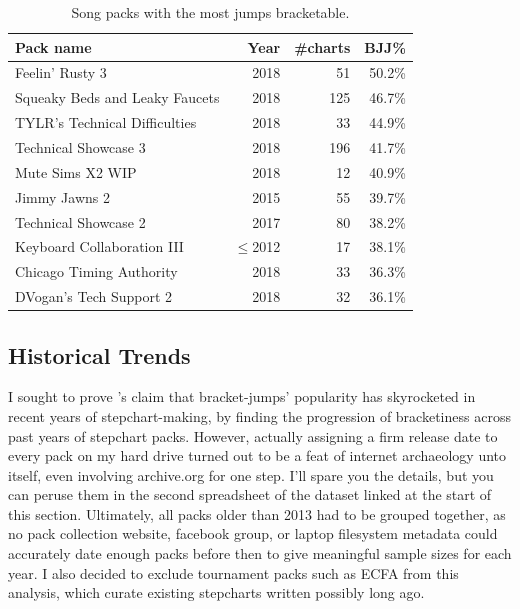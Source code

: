 \documentclass[10pt]{sigplanconf}
\begin{document}
\begin{table}[t]
	\begin{center}
		\small
	\begin{tabular}{l|r|r|r}
		\bf Pack name & \bf Year & \bf \#charts & \bf BJJ\% \\
		\hline
		Feelin' Rusty 3			& 2018	&  51 & 50.2\% \\
		Squeaky Beds and Leaky Faucets	& 2018	& 125 & 46.7\% \\
		TYLR's Technical Difficulties	& 2018	&  33 & 44.9\% \\
		Technical Showcase 3		& 2018	& 196 & 41.7\% \\
		Mute Sims X2 WIP		& 2018	&  12 & 40.9\% \\
		Jimmy Jawns 2			& 2015	&  55 & 39.7\% \\
		Technical Showcase 2		& 2017	&  80 & 38.2\% \\
		Keyboard Collaboration III	& $\le$2012	&  17 & 38.1\% \\
		Chicago Timing Authority	& 2018	&  33 & 36.3\% \\
		DVogan's Tech Support 2		& 2018	&  32 & 36.1\% \\
	\end{tabular}
	\end{center}
	\caption{Song packs with the most jumps bracketable.}
	\label{tab:pack-bjj}
\end{table}

\subsection{Historical Trends}
\label{sec:eval-years}

I sought to prove \cite{dril}'s claim that bracket-jumps' popularity has skyrocketed in recent years of stepchart-making,
by finding the progression of bracketiness across past years of stepchart packs.
However,
actually assigning a firm release date to every pack on my hard drive turned out to be a feat of internet archaeology unto itself,
even involving archive.org for one step.
I'll spare you the details, but you can peruse them in the second spreadsheet of the dataset linked at the start of this section.
Ultimately, all packs older than 2013 had to be grouped together,
as no pack collection website, facebook group, or laptop filesystem metadata could accurately date enough packs
before then to give meaningful sample sizes for each year.
I also decided to exclude tournament packs such as ECFA from this analysis,
which curate existing stepcharts written possibly long ago.
\end{document}
